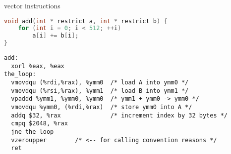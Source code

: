 \begin{frame}[fragile,label=vecInst]{vector instructions}
\begin{lstlisting}[language=C,style=smaller]
void add(int * restrict a, int * restrict b) {
    for (int i = 0; i < 512; ++i)
        a[i] += b[i];
}
\end{lstlisting}
\hrulefill
\begin{lstlisting}
add:
  xorl %eax, %eax
the_loop:
  vmovdqu (%rdi,%rax), %ymm0  /* load A into ymm0 */
  vmovdqu (%rsi,%rax), %ymm1  /* load B into ymm1 */
  vpaddd %ymm1, %ymm0, %ymm0  /* ymm1 + ymm0 -> ymm0 */
  vmovdqu %ymm0, (%rdi,%rax)  /* store ymm0 into A */
  addq $32, %rax              /* increment index by 32 bytes */
  cmpq $2048, %rax          
  jne the_loop
  vzeroupper        /* <-- for calling convention reasons */
  ret
\end{lstlisting}
\end{frame}
